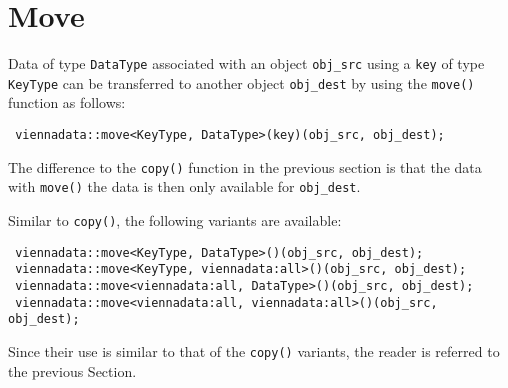 

\section{Move}
Data of type \lstinline|DataType| associated with an object \lstinline|obj_src| using a \lstinline|key| of type \lstinline|KeyType| can be transferred to another object \lstinline|obj_dest| by using
the \lstinline|move()| function as follows:
\begin{lstlisting}
 viennadata::move<KeyType, DataType>(key)(obj_src, obj_dest);
\end{lstlisting}
The difference to the \lstinline|copy()| function in the previous section is that the data with \lstinline|move()| the data is then only available for \lstinline|obj_dest|.

Similar to \lstinline|copy()|, the following variants are available:
\begin{lstlisting}
 viennadata::move<KeyType, DataType>()(obj_src, obj_dest);
 viennadata::move<KeyType, viennadata:all>()(obj_src, obj_dest);
 viennadata::move<viennadata:all, DataType>()(obj_src, obj_dest);
 viennadata::move<viennadata:all, viennadata:all>()(obj_src, obj_dest);
\end{lstlisting}
Since their use is similar to that of the \lstinline|copy()| variants, the reader is referred to the previous Section.



